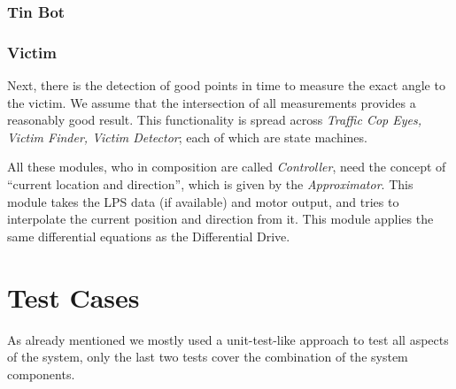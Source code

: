 \documentclass[a4paper,parskip,headheight=38pt]{scrartcl} %
\begin{document}
\subsubsection{Tin Bot}
\subsubsection{Victim}




Next, there is the detection of good points in time to measure the exact angle to the victim.  We assume that the intersection of all measurements provides a reasonably good result.  This functionality is spread across \emph{Traffic Cop Eyes, Victim Finder, Victim Detector}; each of which are state machines.


All these modules, who in composition are called \emph{Controller}, need the concept of \enquote{current location and direction}, which is given by the \emph{Approximator}. This module takes the LPS data (if available) and motor output, and tries to interpolate the current position and direction from it. This module applies the same differential equations as the Differential Drive.

\section{Test Cases}
As already mentioned we mostly used a unit-test-like approach to test all aspects of the system, only the last two tests cover the combination of the system components.
\end{document}
